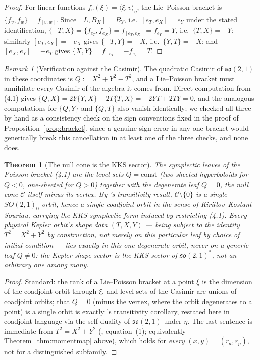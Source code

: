 \documentclass[11pt]{amsart}
\newtheorem{theorem}{Theorem}[section]
\theoremstyle{remark}
\newtheorem*{remark}{Remark}
\begin{document}
\begin{proof}
For linear functions $f_v(\xi)=\langle\xi,v\rangle_\eta$, the Lie--Poisson bracket is $\{f_v,f_w\}=f_{[v,w]}$. Since $[L,B_X]=B_Y$, i.e.\ $[e_T,e_X]=e_Y$ under the stated identification, $\{-T,X\}=\{f_{e_T},f_{e_X}\}=f_{[e_T,e_X]}=f_{e_Y}=Y$, i.e.\ $\{T,X\}=-Y$; similarly $[e_T,e_Y]=-e_X$ gives $\{-T,Y\}=-X$, i.e.\ $\{Y,T\}=-X$; and $[e_X,e_Y]=-e_T$ gives $\{X,Y\}=f_{-e_T}=-f_{e_T}=T$. \qedhere
\end{proof}

\begin{remark}[Verification against the Casimir]
The quadratic Casimir of $\mathfrak{so}(2,1)$ in these coordinates is $Q:=X^2+Y^2-T^2$, and a Lie--Poisson bracket must annihilate every Casimir of the algebra it comes from. Direct computation from (4.1) gives $\{Q,X\}=2Y\{Y,X\}-2T\{T,X\}=-2YT+2TY=0$, and the analogous computations for $\{Q,Y\}$ and $\{Q,T\}$ also vanish identically; we checked all three by hand as a consistency check on the sign conventions fixed in the proof of Proposition~\ref{prop:bracket}, since a genuine sign error in any one bracket would generically break this cancellation in at least one of the three checks, and none does.
\end{remark}

\begin{theorem}[The null cone is the KKS sector]\label{thm:kks}
The symplectic leaves of the Poisson bracket (4.1) are the level sets $Q=\mathrm{const}$ (two-sheeted hyperboloids for $Q<0$, one-sheeted for $Q>0$) together with the degenerate leaf $Q=0$, the null cone $\mathcal C$ itself minus its vertex. By \cite{Ebert2026Cone}'s transitivity result, $\mathcal C\setminus\{0\}$ is a single $SO(2,1)_0$-orbit, hence a single coadjoint orbit in the sense of Kirillov--Kostant--Souriau, carrying the KKS symplectic form induced by restricting (4.1). Every physical Kepler orbit's shape data $(T,X,Y)$ --- being subject to the identity $T^2=X^2+Y^2$ by construction, not merely on this particular leaf by choice of initial condition --- lies exactly in this one degenerate orbit, never on a generic leaf $Q\ne0$: the Kepler shape sector is the KKS sector of $\mathfrak{so}(2,1)^*$, not an arbitrary one among many.
\end{theorem}

\begin{proof}
Standard: the rank of a Lie--Poisson bracket at a point $\xi$ is the dimension of the coadjoint orbit through $\xi$, and level sets of the Casimir are unions of coadjoint orbits; that $Q=0$ (minus the vertex, where the orbit degenerates to a point) is a single orbit is exactly \cite{Ebert2026Cone}'s transitivity corollary, restated here in coadjoint language via the self-duality of $\mathfrak{so}(2,1)$ under $\eta$. The last sentence is immediate from $T^2=X^2+Y^2$ (\cite{Ebert2026Cone}, equation~(1); equivalently Theorem~\ref{thm:momentmap} above), which holds for \emph{every} $(x,y)=(r_a,r_p)$, not for a distinguished subfamily.
\end{proof}
\end{document}
